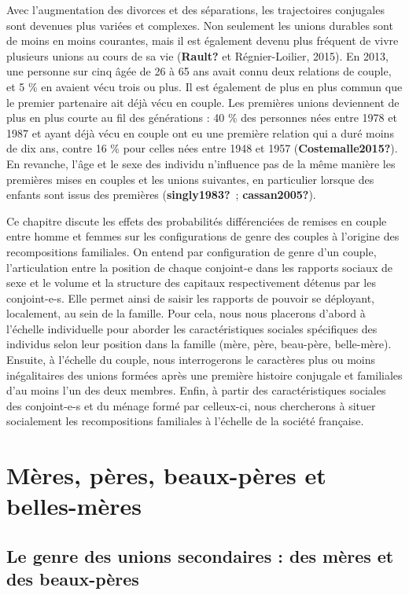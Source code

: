 \documentclass[
  12pt,
]{book}
\begin{document}
Avec l'augmentation des divorces et des séparations, les trajectoires
conjugales sont devenues plus variées et complexes. Non seulement les
unions durables sont de moins en moins courantes, mais il est également
devenu plus fréquent de vivre plusieurs unions au cours de sa vie
(\textbf{Rault?} et Régnier-Loilier, 2015). En 2013, une personne sur
cinq âgée de 26 à 65 ans avait connu deux relations de couple, et 5 \%
en avaient vécu trois ou plus. Il est également de plus en plus commun
que le premier partenaire ait déjà vécu en couple. Les premières unions
deviennent de plus en plus courte au fil des générations : 40 \% des
personnes nées entre 1978 et 1987 et ayant déjà vécu en couple ont eu
une première relation qui a duré moins de dix ans, contre 16 \% pour
celles nées entre 1948 et 1957 (\textbf{Costemalle2015?}). En revanche,
l'âge et le sexe des individu n'influence pas de la même manière les
premières mises en couples et les unions suivantes, en particulier
lorsque des enfants sont issus des premières (\textbf{singly1983?}~;
\textbf{cassan2005?}).

Ce chapitre discute les effets des probabilités différenciées de remises
en couple entre homme et femmes sur les configurations de genre des
couples à l'origine des recompositions familiales. On entend par
configuration de genre d'un couple, l'articulation entre la position de
chaque conjoint-e dans les rapports sociaux de sexe et le volume et la
structure des capitaux respectivement détenus par les conjoint-e-s. Elle
permet ainsi de saisir les rapports de pouvoir se déployant, localement,
au sein de la famille. Pour cela, nous nous placerons d'abord à
l'échelle individuelle pour aborder les caractéristiques sociales
spécifiques des individus selon leur position dans la famille (mère,
père, beau-père, belle-mère). Ensuite, à l'échelle du couple, nous
interrogerons le caractères plus ou moins inégalitaires des unions
formées après une première histoire conjugale et familiales d'au moins
l'un des deux membres. Enfin, à partir des caractéristiques sociales des
conjoint-e-s et du ménage formé par celleux-ci, nous chercherons à
situer socialement les recompositions familiales à l'échelle de la
société française.

\section{Mères, pères, beaux-pères et
belles-mères}\label{muxe8res-puxe8res-beaux-puxe8res-et-belles-muxe8res}

\subsection{Le genre des unions secondaires : des mères et des
beaux-pères}\label{le-genre-des-unions-secondaires-des-muxe8res-et-des-beaux-puxe8res}
\end{document}
